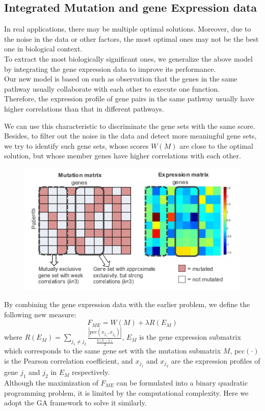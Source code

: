 \documentclass[xcolor=dvipsnames]{beamer}
\begin{document}
\subsection{Integrated Mutation and gene Expression data}
\begin{frame}
In real applications, there may be multiple optimal solutions. Moreover, due to the noise in the data or other factors, the most optimal ones may not be the best one in biological context.\\
To extract the most biologically significant ones, we generalize the above model by integrating the gene expression data to improve its performance.\\
Our new model is based on such as observation that the genes in the same pathway usually collaborate with each other to execute one function.\\
Therefore, the expression profile of gene pairs in the same pathway usually have higher correlations than that in different pathways.\\
\end{frame}
\begin{frame}
We can use this characteristic to discriminate the gene sets with the same score.\\
Besides, to filter out the noise in the data and detect more meaningful gene sets, we try to identify such gene sets, whose scores $W(M)$ are close to the optimal solution, but whose member genes have higher correlations with each other.\\
\begin{figure}
\centering
\includegraphics[width=0.6\linewidth]{express.png}
\end{figure}
\end{frame}
\begin{frame}
By combining the gene expression data with the earlier problem, we define the following new measure:
\[
F_{ME}=W(M)+\lambda R(E_M)
\]
where $R(E_M)=\sum_{j_1\neq j_2}\frac{|\text{pcc}(x_{j_1},x_{j_2})|}{\frac{k(k-1)}{2}}$, $E_M$ is the gene expression submatrix which corresponds to the same gene set with the mutation submatrix $M$, $\text{pcc}(\cdot)$ is the Pearson correlation coefficient, and $x_{j_1}$ and $x_{j_2}$ are the expression profiles of gene $j_1$ and $j_2$ in $E_M$ respectively.\\
Although the maximization of $F_{ME}$ can be formulated into a binary quadratic programming problem, it is limited by the computational complexity. Here we adopt the GA framework to solve it similarly.
\end{frame}
\end{document}
